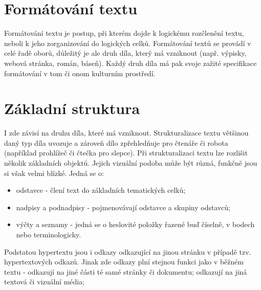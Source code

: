 \documentclass[a4paper]{article}
\begin{document}
\section{Formátování textu}

    Formátování textu je postup, při kterém dojde k logickému rozčlenění textu, neboli k jeho zorganizování do logických celků. Formátování textů se provádí v celé řadě oborů, důležitý je ale druh díla, který má vzniknout (např. výpisky, webová stránka, román, báseň). Každý druh díla má pak svoje zažité specifikace formátování v tom či onom kulturním prostředí.

\section{Základní struktura} 

I zde závisí na druhu díla, které má vzniknout. Strukturalizace textu většinou daný typ díla uvozuje a zároveň dílo zpřehledňuje pro čtenáře či robota (například prohlížeč či čtečka pro slepce). Při strukturalizaci textu lze rozlišit několik základních objektů. Jejich vizuální podoba může být různá, funkčně jsou si však velmi blízké. Jedná se o:

\begin{itemize}
    \item odstavce - člení text do základních tematických celků;
    \item nadpisy a podnadpisy - pojmenovávají odstavce a skupiny odstavců;
    \item výčty a seznamy - jedná se o heslovité položky řazené buď číselně, v bodech nebo terminologicky.

\end{itemize}
Podstatou hypertextu jsou i odkazy odkazující na jinou stránku v případě tzv. hypertextových odkazů. Jinak zde odkazy plní stejnou funkci jako v běžném textu - odkazují na jiné části té samé stránky či dokumentu; odkazují na jiná textová či vizuální média;
\end{document}
